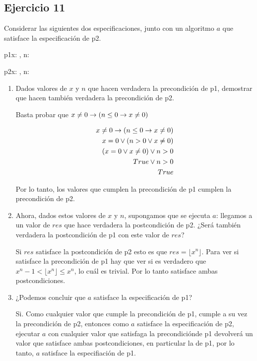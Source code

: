 \subsection{Ejercicio 11}
Considerar las siguientes dos especificaciones, junto con un algoritmo $a$ que satisface la especificación de p2.

\begin{proc}{p1}{\In x: \float, \In n: \ent}{\ent}
\end{proc}

\begin{proc}{p2}{\In x: \float, \In n: \ent}{\ent}
\end{proc}

\begin{enumerate}[label=\alph*)]
      \item Dados valores de $x$ y $n$ que hacen verdadera la precondición de p1, demostrar que hacen también verdadera la precondición de p2.

            Basta probar que $x \neq 0 \rightarrow (n \leq 0 \rightarrow x \neq 0)$

            \begin{align*}
                  x \neq 0 \rightarrow (n \leq 0 \rightarrow x \neq 0) \\
                  x = 0 \lor (n > 0 \lor x \neq 0)         \\
                  (x = 0 \lor x \neq 0) \lor n > 0         \\
                  True \lor n > 0                          \\
                  True
            \end{align*}

            Por lo tanto, los valores que cumplen la precondición de p1 cumplen la precondición de p2.

      \item Ahora, dados estos valores de $x$ y $n$, supongamos que se ejecuta $a$: llegamos a un valor de $res$ que hace verdadera la postcondición de p2. ¿Será también verdadera la postcondición de p1 con este valor de $res$?

            Si $res$ satisface la postcondición de p2 esto es que $res = \lfloor x^n \rfloor$. Para ver si satisface la precondición de p1 hay que ver si es verdadero que $x^n - 1 < \lfloor x^n \rfloor \leq x^n$, lo cuál es trivial. Por lo tanto satisface ambas postcondiciones.

      \item ¿Podemos concluir que $a$ satisface la especificación de p1?

            Si. Como cualquier valor que cumple la precondición de p1, cumple a su vez la precondición de p2, entonces como $a$ satisface la especificación de p2, ejecutar $a$ con cualquier valor que satisfaga la precondiciónde p1 devolverá un valor que satisface ambas postcondiciones, en particular la de p1, por lo tanto, $a$ satisface la especifiación de p1.
\end{enumerate}


